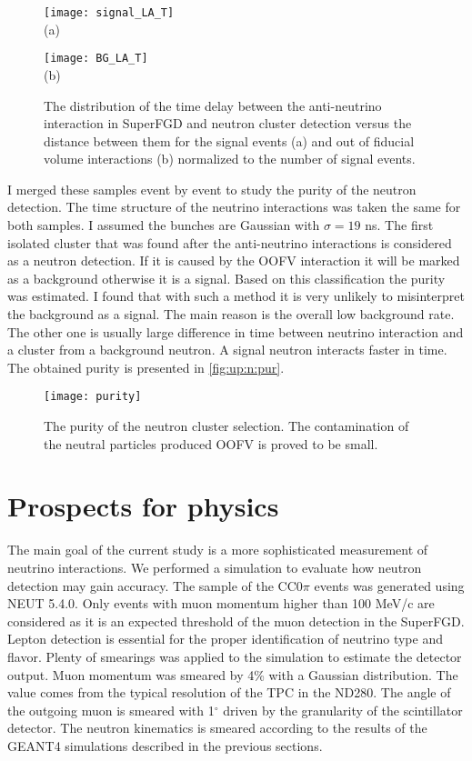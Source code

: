 \documentclass[main.tex]{subfiles}
\begin{document}
\begin{figure}[!ht]
  \centering
  \begin{minipage}{0.49\linewidth}
    \centering
    \texttt{[image: signal\_LA\_T]} \\ (a)
  \end{minipage}
  \begin{minipage}{0.49\linewidth}
    \centering
    \texttt{[image: BG\_LA\_T]} \\ (b)
  \end{minipage}
  \caption{The distribution of the time delay between the anti-neutrino interaction in SuperFGD and neutron cluster detection versus the distance between them for the signal events (a) and out of fiducial volume interactions (b) normalized to the number of signal events.}
  \label{fig:up:n:bg}
\end{figure}

I merged these samples event by event to study the purity of the neutron detection. The time structure of the neutrino interactions was taken the same for both samples. I assumed the bunches are Gaussian with $\sigma=19$ ns.  The first isolated cluster that was found after the anti-neutrino interactions is considered as a neutron detection. If it is caused by the OOFV interaction it will be marked as a background otherwise it is a signal. Based on this classification the purity was estimated. I found that with such a method it is very unlikely to misinterpret the background as a signal. The main reason is the overall low background rate. The other one is usually large difference in time between neutrino interaction and a cluster from a background neutron. A signal neutron interacts faster in time. The obtained purity is presented in \autoref{fig:up:n:pur}.

\begin{figure}[!ht]
  \centering
  \texttt{[image: purity]}
  \caption{The purity of the neutron cluster selection. The contamination of the neutral particles produced OOFV is proved to be small.}
  \label{fig:up:n:pur}
\end{figure}


\section{Prospects for physics}
The main goal of the current study is a more sophisticated measurement of neutrino interactions. We performed a simulation to evaluate how neutron detection may gain accuracy. The sample of the CC0$\pi$ events was generated using NEUT 5.4.0. Only events with muon momentum higher than 100 MeV/c are considered as it is an expected threshold of the muon detection in the SuperFGD. Lepton detection is essential for the proper identification of neutrino type and flavor. Plenty of smearings was applied to the simulation to estimate the detector output. Muon momentum was smeared by 4\% with a Gaussian distribution. The value comes from the typical resolution of the TPC in the ND280. The angle of the outgoing muon is smeared with 1${}^\circ$ driven by the granularity of the scintillator detector. The neutron kinematics is smeared according to the results of the GEANT4 simulations described in the previous sections.
\end{document}
